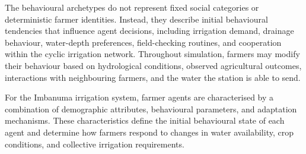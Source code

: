 \documentclass{article}
\begin{document}
\begin{changed}
The behavioural archetypes do not represent fixed social categories or deterministic farmer identities. Instead, they describe initial behavioural tendencies that influence agent decisions, including irrigation demand, drainage behaviour, water-depth preferences, field-checking routines, and cooperation within the cyclic irrigation network. Throughout simulation, farmers may modify their behaviour based on hydrological conditions, observed agricultural outcomes, interactions with neighbouring farmers, and the water the station is able to send.
\end{changed}

For the Imbanuma irrigation system, farmer agents are characterised by a combination of demographic attributes, behavioural parameters, and adaptation mechanisms. These characteristics define the initial behavioural state of each agent and determine how farmers respond to changes in water availability, crop conditions, and collective irrigation requirements.
\end{document}
